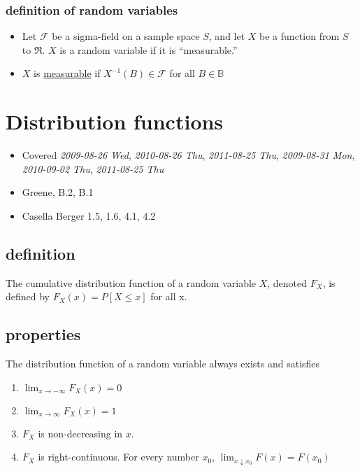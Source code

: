 \documentclass[11pt]{article}
\begin{document}
\subsubsection{definition of random variables}
\label{sec-1-3-1}

\begin{itemize}
\item Let $\mathcal{F}$ be a sigma-field on a sample space $S$, and
        let $X$ be a function from $S$ to $\Re$.  $X$ is a random
        variable if it is ``measurable.''
\item $X$ is \underline{measurable} if $X^{-1}(B) \in \mathcal{F}$ for all $B
        \in \mathbb{B}$
\end{itemize}
\section{Distribution functions}
\label{sec-2}

\begin{itemize}
\item Covered \textit{2009-08-26 Wed}, \textit{2010-08-26 Thu}, \textit{2011-08-25 Thu},
      \textit{2009-08-31 Mon}, \textit{2010-09-02 Thu}, \textit{2011-08-25 Thu}
\item Greene, B.2, B.1
\item Casella Berger 1.5, 1.6, 4.1, 4.2
\end{itemize}
\subsection{definition}
\label{sec-2-1}

     The cumulative distribution function of a random variable $X$,
     denoted $F_X$, is defined by $F_X(x) = P[X \leq x]$ for all x.
\subsection{properties}
\label{sec-2-2}

     The distribution function of a random variable always exists and
     satisfies
\begin{enumerate}
\item $\lim_{x \to -\infty} F_X(x) = 0$
\item $\lim_{x \to \infty} F_X(x) = 1$
\item $F_X$ is non-decreasing in $x$.
\item $F_X$ is right-continuous.  For every number $x_0$, $\lim_{x
        \downarrow x_0} F(x) = F(x_0)$
\end{enumerate}
\end{document}
